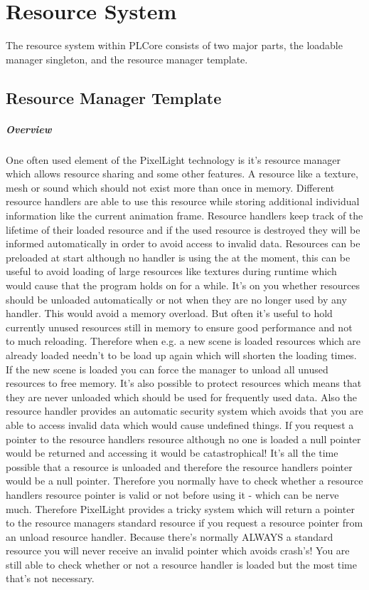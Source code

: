 \chapter{Resource System}
The resource system within PLCore consists of two major parts, the loadable manager singleton, and the resource manager template.




\section{Resource Manager Template}


\paragraph{Overview}
One often used element of the PixelLight technology is it's resource manager which allows resource sharing and some other features. A resource like a texture, mesh or sound which should not exist more than once in memory. Different resource handlers are able to use this resource while storing additional individual information like the current animation frame. Resource handlers keep track of the lifetime of their loaded resource and if the used resource is destroyed they will be informed automatically in order to avoid access to invalid data. Resources can be preloaded at start although no handler is using the at the moment, this can be useful to avoid loading of large resources like textures during runtime which would cause that the program holds on for a while. It's on you whether resources should be unloaded automatically or not when they are no longer used by any handler. This would avoid a memory overload. But often it's useful to hold currently unused resources still in memory to ensure good performance and not to much reloading. Therefore when e.g. a new scene is loaded resources which are already loaded needn't to be load up again which will shorten the loading times. If the new scene is loaded you can force the manager to unload all unused resources to free memory. It's also possible to protect resources which means that they are never unloaded which should be used for frequently used data. Also the resource handler provides an automatic security system which avoids that you are able to access invalid data which would cause undefined things. If you request a pointer to the resource handlers resource although no one is loaded a null pointer would be returned and accessing it would be catastrophical! It's all the time possible that a resource is unloaded and therefore the resource handlers pointer would be a null pointer. Therefore you normally have to check whether a resource handlers resource pointer is valid or not before using it - which can be nerve much. Therefore PixelLight provides a tricky system which will return a pointer to the resource managers standard resource if you request a resource pointer from an unload resource handler. Because there's normally ALWAYS a standard resource you will never receive an invalid pointer which avoids crash's! You are still able to check whether or not a resource handler is loaded but the most time that's not necessary.

